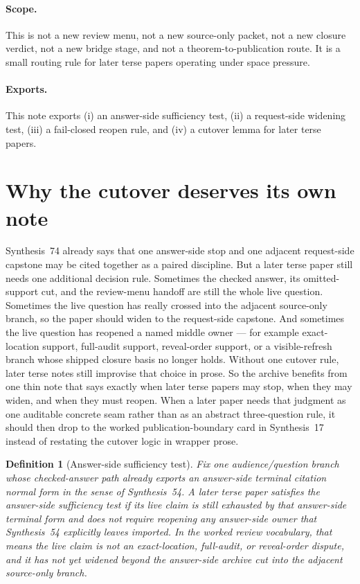 \documentclass[11pt]{article}
\newtheorem{definition}{Definition}
\begin{document}
\paragraph{Scope.}
This is not a new review menu, not a new source-only packet, not a new closure verdict, not a new bridge stage, and not a theorem-to-publication route.
It is a small routing rule for later terse papers operating under space pressure.

\paragraph{Exports.}
This note exports (i) an answer-side sufficiency test, (ii) a request-side widening test, (iii) a fail-closed reopen rule, and (iv) a cutover lemma for later terse papers.

\section{Why the cutover deserves its own note}
Synthesis~74 already says that one answer-side stop and one adjacent request-side capstone may be cited together as a paired discipline.
But a later terse paper still needs one additional decision rule.
Sometimes the checked answer, its omitted-support cut, and the review-menu handoff are still the whole live question.
Sometimes the live question has really crossed into the adjacent source-only branch, so the paper should widen to the request-side capstone.
And sometimes the live question has reopened a named middle owner --- for example exact-location support, full-audit support, reveal-order support, or a visible-refresh branch whose shipped closure basis no longer holds.
Without one cutover rule, later terse notes still improvise that choice in prose.
So the archive benefits from one thin note that says exactly when later terse papers may stop, when they may widen, and when they must reopen. When a later paper needs that judgment as one auditable concrete seam rather than as an abstract three-question rule, it should then drop to the worked publication-boundary card in Synthesis~17 instead of restating the cutover logic in wrapper prose.

\begin{definition}[Answer-side sufficiency test]
Fix one audience/question branch whose checked-answer path already exports an answer-side terminal citation normal form in the sense of Synthesis~54.
A later terse paper satisfies the \emph{answer-side sufficiency test} if its live claim is still exhausted by that answer-side terminal form and does not require reopening any answer-side owner that Synthesis~54 explicitly leaves imported.
In the worked review vocabulary, that means the live claim is \emph{not} an \textsf{exact-location}, \textsf{full-audit}, or \textsf{reveal-order} dispute, and it has not yet widened beyond the answer-side archive cut into the adjacent source-only branch.
\end{definition}
\end{document}
